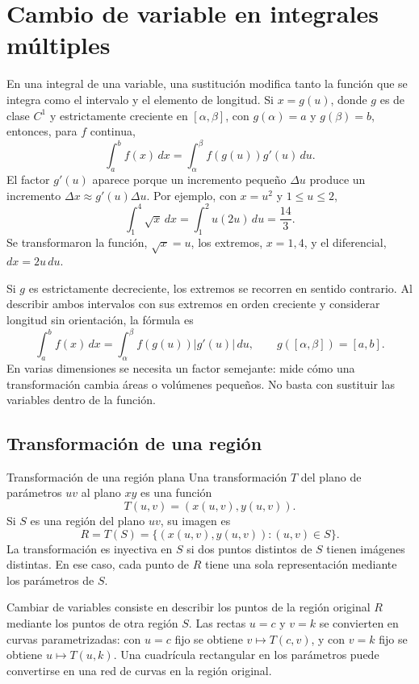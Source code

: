 \section{Cambio de variable en integrales múltiples}

En una integral de una variable, una sustitución modifica tanto la función que se integra como el intervalo y el elemento de longitud. Si $x=g(u)$, donde $g$ es de clase $C^1$ y estrictamente creciente en $[\alpha,\beta]$, con $g(\alpha)=a$ y $g(\beta)=b$, entonces, para $f$ continua,
\[
\int_a^b f(x)\,dx=\int_\alpha^\beta f(g(u))g'(u)\,du.
\]
El factor $g'(u)$ aparece porque un incremento pequeño $\Delta u$ produce un incremento $\Delta x\approx g'(u)\Delta u$. Por ejemplo, con $x=u^2$ y $1\leq u\leq2$,
\[
\int_1^4\sqrt{x}\,dx
=\int_1^2 u(2u)\,du
=\frac{14}{3}.
\]
Se transformaron la función, $\sqrt{x}=u$, los extremos, $x=1,4$, y el diferencial, $dx=2u\,du$.

Si $g$ es estrictamente decreciente, los extremos se recorren en sentido contrario. Al describir ambos intervalos con sus extremos en orden creciente y considerar longitud sin orientación, la fórmula es
\[
\int_a^b f(x)\,dx=\int_\alpha^\beta f(g(u))|g'(u)|\,du,
\qquad g([\alpha,\beta])=[a,b].
\]
En varias dimensiones se necesita un factor semejante: mide cómo una transformación cambia áreas o volúmenes pequeños. No basta con sustituir las variables dentro de la función.

\subsection{Transformación de una región}

\begin{mydefinition}{Transformación de una región plana}
Una transformación $T$ del plano de parámetros $uv$ al plano $xy$ es una función
\[
T(u,v)=(x(u,v),y(u,v)).
\]
Si $S$ es una región del plano $uv$, su imagen es
\[
R=T(S)=\{(x(u,v),y(u,v)):(u,v)\in S\}.
\]
La transformación es inyectiva en $S$ si dos puntos distintos de $S$ tienen imágenes distintas. En ese caso, cada punto de $R$ tiene una sola representación mediante los parámetros de $S$.
\end{mydefinition}

Cambiar de variables consiste en describir los puntos de la región original $R$ mediante los puntos de otra región $S$. Las rectas $u=c$ y $v=k$ se convierten en curvas parametrizadas: con $u=c$ fijo se obtiene $v\mapsto T(c,v)$, y con $v=k$ fijo se obtiene $u\mapsto T(u,k)$. Una cuadrícula rectangular en los parámetros puede convertirse en una red de curvas en la región original.

